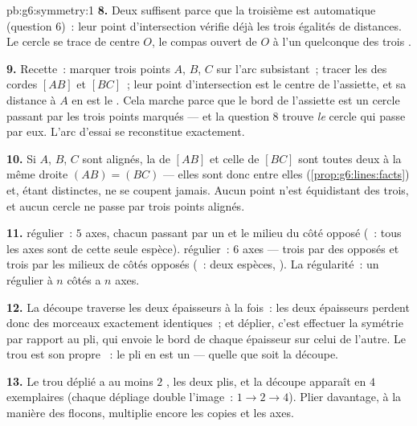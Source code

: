\begin{solution}{pb:g6:symmetry:1}
\textbf{8.} Deux  suffisent parce que la troisième est
automatique (question 6)~: leur point d'intersection vérifie déjà
les trois égalités de distances. Le cercle se trace de centre $O$,
le compas ouvert de $O$ à l'un quelconque des trois .

\textbf{9.} Recette~: marquer trois points $A$, $B$, $C$ sur l'arc
subsistant~; tracer les  des cordes $[AB]$ et $[BC]$~;
leur point d'intersection est le centre de l'assiette, et sa
distance à $A$ en est le . Cela marche parce que le bord de
l'assiette est un cercle passant par les trois points marqués --- et
la question 8 trouve \emph{le} cercle qui passe par eux. L'arc
d'essai se reconstitue exactement.

\textbf{10.} Si $A$, $B$, $C$ sont alignés, la  de $[AB]$
et celle de $[BC]$ sont toutes deux  à la même
droite $(AB) = (BC)$ --- elles sont donc  entre elles
(\cref{prop:g6:lines:facts}) et, étant distinctes, ne se coupent
jamais. Aucun point n'est équidistant des trois, et aucun cercle ne
passe par trois points alignés.

\textbf{11.}  régulier~: $5$ axes, chacun passant par un
 et le milieu du côté opposé (~: tous les axes
sont de cette seule espèce).  régulier~: $6$ axes --- trois
par des  opposés et trois par les milieux de côtés opposés
(~: deux espèces, ). La régularité~: un
 régulier à $n$ côtés a $n$ axes.

\textbf{12.} La découpe traverse les deux épaisseurs à la fois~: les
deux épaisseurs perdent donc des morceaux exactement identiques~; et
déplier, c'est effectuer la symétrie par rapport au pli, qui envoie
le bord de chaque épaisseur sur celui de l'autre. Le trou est son
propre ~: le pli en est un  --- quelle que
soit la découpe.

\textbf{13.} Le trou déplié a au moins $2$ , les
deux plis, et la découpe apparaît en $4$ exemplaires (chaque
dépliage double l'image~: $1 \to 2 \to 4$). Plier davantage, à la
manière des flocons, multiplie encore les copies et les axes.


\end{solution}
